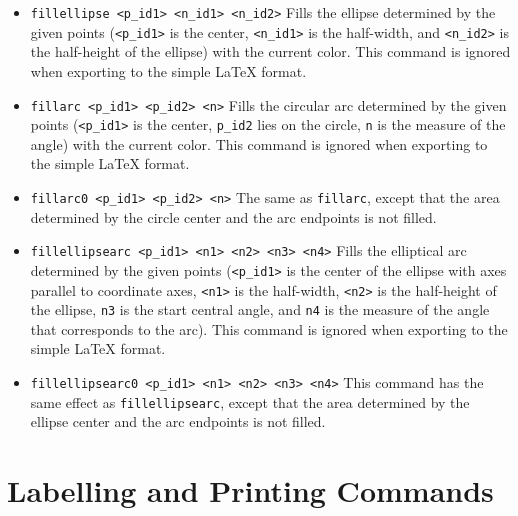 \documentclass[a4paper]{book}
\begin{document}
\begin{itemize}
\item \verb|fillellipse <p_id1> <n_id1> <n_id2>|
        Fills the ellipse determined by the given points
        (\verb|<p_id1>| is the center, \verb|<n_id1>| is
        the half-width, and \verb|<n_id2>| is the half-height 
        of the ellipse) with the current color.
        This command is ignored when exporting to the
        simple \LaTeX{} format.

\item \verb|fillarc <p_id1> <p_id2> <n>|
        Fills the circular arc determined by the given points
        (\verb|<p_id1>| is the center, \verb|p_id2| lies
        on the circle, \verb|n| is the measure of the angle)
        with the current color. This command is ignored when
        exporting to the simple \LaTeX{} format.

\item \verb|fillarc0 <p_id1> <p_id2> <n>|
        The same as \verb|fillarc|, except that the area
        determined by the circle center and the arc endpoints
        is not filled.

\item \verb|fillellipsearc <p_id1> <n1> <n2> <n3> <n4>|
        Fills the elliptical arc determined by the given points
        (\verb|<p_id1>| is the center of the ellipse with
        axes parallel to coordinate axes, \verb|<n1>| is the
        half-width, \verb|<n2>| is the half-height of the ellipse,
        \verb|n3| is the start central angle, and \verb|n4| is the
        measure of the angle that corresponds to the arc).
        This command is ignored when exporting to the simple
        \LaTeX{} format.

\item \verb|fillellipsearc0 <p_id1> <n1> <n2> <n3> <n4>|
        This command has the same effect as \verb|fillellipsearc|,
        except that the area determined by the ellipse center and
        the arc endpoints is not filled.
\end{itemize}



\section{Labelling and Printing Commands}
\end{document}
